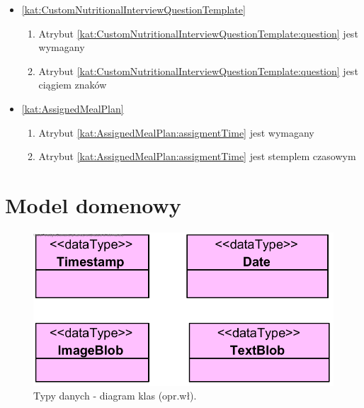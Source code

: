 \begin{itemize}[label={\textbf{Ograniczenia dla}}, wide, labelwidth=!, labelindent=0pt]
    \item\ref{kat:CustomNutritionalInterviewQuestionTemplate}
    \begin{enumerate}[label={\textbf{OGR/\protect\threedigits{\arabic{enumi}}}}, wide, labelwidth=!, align=left, leftmargin=3cm, resume]
        \item Atrybut \ref{kat:CustomNutritionalInterviewQuestionTemplate:question} jest wymagany

        \item Atrybut \ref{kat:CustomNutritionalInterviewQuestionTemplate:question} jest ciągiem znaków
    \end{enumerate}

    \item\ref{kat:AssignedMealPlan}
    \begin{enumerate}[label={\textbf{OGR/\protect\threedigits{\arabic{enumi}}}}, wide, labelwidth=!, align=left, leftmargin=3cm, resume]
        \item Atrybut \ref{kat:AssignedMealPlan:assigmentTime} jest wymagany

        \item Atrybut \ref{kat:AssignedMealPlan:assigmentTime} jest stemplem czasowym
    \end{enumerate}
\end{itemize}

\section{Model domenowy}\label{sec:domainModel}

\begin{minipage}{\textwidth}
    \begin{figure}[H]
        \centering\includegraphics[scale=0.7]{../uml/class_diagrams/dataTypes.png}
        \caption{Typy danych - diagram klas (opr.wł).}\label{rysunek:class-diagram-data-types}
    \end{figure}
\end{minipage}

